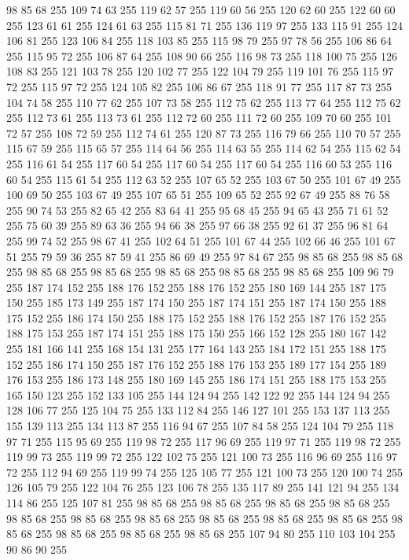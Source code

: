 98 85 68 255 109 74 63 255 119 62 57 255 119 60 56 255 120 62 60 255 122 60 60 255 123 61 61 255 124 61 63 255 115 81 71 255 136 119 97 255 133 115 91 255 124 106 81 255 123 106 84 255 118 103 85 255 115 98 79 255 97 78 56 255 106 86 64 255 115 95 72 255 106 87 64 255 108 90 66 255 116 98 73 255 118 100 75 255 126 108 83 255 121 103 78 255 120 102 77 255 122 104 79 255 119 101 76 255 115 97 72 255 115 97 72 255 124 105 82 255 106 86 67 255 118 91 77 255 117 87 73 255 104 74 58 255 110 77 62 255 107 73 58 255 112 75 62 255 113 77 64 255 112 75 62 255 112 73 61 255 113 73 61 255 112 72 60 255 111 72 60 255 109 70 60 255 101 72 57 255 108 72 59 255 112 74 61 255 120 87 73 255 116 79 66 255 110 70 57 255 115 67 59 255 115 65 57 255 114 64 56 255 114 63 55 255 114 62 54 255 115 62 54 255 116 61 54 255 117 60 54 255 117 60 54 255 117 60 54 255 116 60 53 255 116 60 54 255 115 61 54 255 112 63 52 255
107 65 52 255 103 67 50 255 101 67 49 255 100 69 50 255 103 67 49 255 107 65 51 255 109 65 52 255 92 67 49 255 88 76 58 255 90 74 53 255 82 65 42 255 83 64 41 255 95 68 45 255 94 65 43 255 71 61 52 255 75 60 39 255 89 63 36 255 94 66 38 255 97 66 38 255 92 61 37 255 96 81 64 255 99 74 52 255 98 67 41 255 102 64 51 255 101 67 44 255 102 66 46 255 101 67 51 255 79 59 36 255 87 59 41 255 86 69 49 255 97 84 67 255 98 85 68 255 98 85 68 255 98 85 68 255 98 85 68 255 98 85 68 255 98 85 68 255 98 85 68 255 109 96 79 255 187 174 152 255 188 176 152 255 188 176 152 255 180 169 144 255 187 175 150 255 185 173 149 255 187 174 150 255 187 174 151 255 187 174 150 255 188 175 152 255 186 174 150 255 188 175 152 255 188 176 152 255 187 176 152 255 188 175 153 255 187 174 151 255 188 175 150 255 166 152 128 255 180 167 142 255 181 166 141 255 168 154 131 255 177 164 143 255 184 172 151 255 188 175 152 255 186 174 150 255
187 176 152 255 188 176 153 255 189 177 154 255 189 176 153 255 186 173 148 255 180 169 145 255 186 174 151 255 188 175 153 255 165 150 123 255 152 133 105 255 144 124 94 255 142 122 92 255 144 124 94 255 128 106 77 255 125 104 75 255 133 112 84 255 146 127 101 255 153 137 113 255 155 139 113 255 134 113 87 255 116 94 67 255 107 84 58 255 124 104 79 255 118 97 71 255 115 95 69 255 119 98 72 255 117 96 69 255 119 97 71 255 119 98 72 255 119 99 73 255 119 99 72 255 122 102 75 255 121 100 73 255 116 96 69 255 116 97 72 255 112 94 69 255 119 99 74 255 125 105 77 255 121 100 73 255 120 100 74 255 126 105 79 255 122 104 76 255 123 106 78 255 135 117 89 255 141 121 94 255 134 114 86 255 125 107 81 255 98 85 68 255 98 85 68 255 98 85 68 255 98 85 68 255 98 85 68 255 98 85 68 255 98 85 68 255 98 85 68 255 98 85 68 255 98 85 68 255 98 85 68 255 98 85 68 255 98 85 68 255 98 85 68 255 107 94 80 255 110 103 104 255 90 86 90 255
